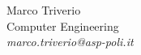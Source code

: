 \begin{flushright}


      Marco Triverio\\Computer Engineering\\ \emph{marco.triverio@asp-poli.it} \\ 


\end{flushright}
\begin{center}



\end{center} \clearpage
